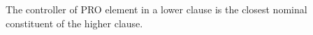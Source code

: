 \begin{generalization}\label{gen:11}
	The controller of PRO element in a lower clause is the closest nominal constituent of the higher clause.
\end{generalization}

%
%

